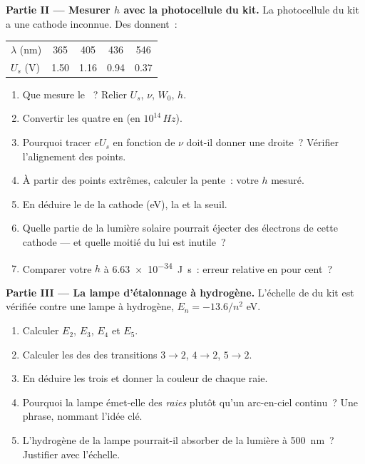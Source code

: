 \begin{problem}
\medskip
\noindent\textbf{Partie II --- Mesurer $h$ avec la photocellule du
kit.}
La photocellule du kit a une cathode inconnue. Des
 donnent~:
\begin{center}\small
\begin{tabular}{lcccc}
$\lambda$ (\unit{nm}) & 365 & 405 & 436 & 546\\
$U_s$ (\unit{V}) & 1.50 & 1.16 & 0.94 & 0.37
\end{tabular}
\end{center}
\begin{enumerate}[resume]
  \item Que mesure le ~? Relier
        $U_s$, $\nu$, $W_0$, $h$.
  \item Convertir les quatre
         en  (en
        $10^{14}\,\unit{Hz}$).
  \item Pourquoi tracer $eU_s$ en fonction de $\nu$ doit-il donner une
        droite~? Vérifier l'alignement des points.
  \item À partir des points extrêmes, calculer la pente~: votre $h$
        mesuré.
  \item En déduire le  de la
        cathode (\unit{eV}), la  et la
         seuil.
  \item Quelle partie de la lumière solaire pourrait éjecter des
        électrons de cette cathode --- et quelle moitié du
         lui est inutile~?
  \item Comparer votre $h$ à \qty{6.63e-34}{J.s}~: erreur relative en
        pour cent~?
\end{enumerate}

\medskip
\noindent\textbf{Partie III --- La lampe d'étalonnage à hydrogène.}
L'échelle de  du kit est
vérifiée contre une lampe à hydrogène, $E_n = -13.6/n^2$ \unit{eV}.
\begin{enumerate}[resume]
  \item Calculer $E_2$, $E_3$, $E_4$ et $E_5$.
  \item Calculer les  des  des transitions
        $3 \to 2$, $4 \to 2$, $5 \to 2$.
  \item En déduire les trois
         et donner la couleur
        de chaque raie.
  \item Pourquoi la lampe émet-elle des \emph{raies} plutôt qu'un
        arc-en-ciel continu~? Une phrase, nommant l'idée clé.
  \item L'hydrogène de la lampe pourrait-il absorber de la lumière à
        \qty{500}{nm}~? Justifier avec l'échelle.
\end{enumerate}


\end{problem}
